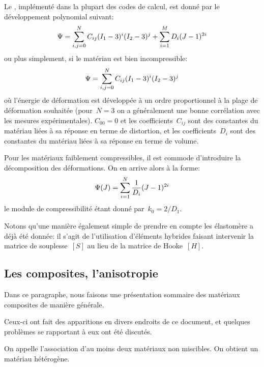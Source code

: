 \medskip
Le ,
implémenté dans la plupart des codes de calcul, est donné par le développement polynomial suivant:
\begin{equation}
\Psi = \displaystyle\sum\limits_{i,j=0}^N C_{ij}(I_1-3)^i(I_2-3)^j + \displaystyle\sum_{i=1}^M D_i(J-1)^{2i}
\end{equation}
ou plus simplement, si le matériau est bien incompressible:
\begin{equation}
\Psi = \displaystyle\sum\limits_{i,j=0}^N C_{ij}(I_1-3)^i(I_2-3)^j
\end{equation}
où l'énergie de déformation est développée à un ordre proportionnel à la plage
de déformation souhaitée (pour~$N=3$ on a généralement une bonne corrélation
avec les mesures expérimentales).
$C_{00}=0$ et les coefficients~$C_{ij}$ sont des constantes du matériau liées à sa réponse
en terme de distortion, et les coefficients~$D_i$ sont des constantes du matériau liées à sa réponse
en terme de volume.

\medskip
Pour les matériaux faiblement compressibles, il est commode d'introduire la
décomposition des déformations.
On en arrive alors à la forme:
\begin{equation}
\Psi(J) = \displaystyle\sum\limits_{i=1}^N \dfrac1{D_i}(J-1)^{2i}
\end{equation}
le module de compressibilité étant donné par~$k_0=2/D_1$.


\medskip
Notons qu'une manière également simple de prendre en compte les élastomère a
déjà été donnée: il s'agit de l'utilisation d'éléments hybrides faisant intervenir
la matrice de souplesse~$[S]$ au lieu de la matrice de Hooke~$[H]$.






\medskip
\subsection{Les composites, l'anisotropie}

Dans ce paragraphe, nous faisons une présentation sommaire des matériaux composites
de manière générale.

Ceux-ci ont fait des apparitions en divers endroits de ce document, et quelques problèmes
se rapportant à eux ont été discutés.
\begin{definition}
On appelle  l'association d'au moins deux matériaux non miscibles.
On obtient un matériau hétérogène.
\end{definition}


